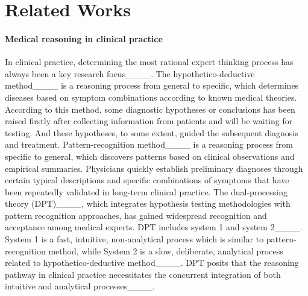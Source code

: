 \section{Related Works}
\paragraph{Medical reasoning in clinical practice} In clinical practice, determining the most rational expert thinking process has always been a key research focus____. The hypothetico-deductive method____ is a reasoning process from general to specific, which determines diseases based on symptom combinations according to known medical theories. According to this method, some diagnostic hypotheses or conclusions has been raised firstly after collecting information from patients and will be waiting for testing. And these hypotheses, to some extent, guided the subsequent diagnosis and treatment. Pattern-recognition method____ is a reasoning process from specific to general, which discovers patterns based on clinical observations and empirical summaries. Physicians quickly establish preliminary diagnoses through certain typical descriptions and specific combinations of symptoms that have been repeatedly validated in long-term clinical practice. The dual-processing theory (DPT)____, which integrates hypothesis testing methodologies with pattern recognition approaches, has gained widespread recognition and acceptance among medical experts. DPT includes system 1 and system 2____.  System 1 is a fast, intuitive, non-analytical process which is similar to pattern-recognition method, while System 2 is a slow, deliberate, analytical process related to hypothetico-deductive method____. DPT posits that the reasoning pathway in clinical practice necessitates the concurrent integration of both intuitive and analytical processes____.

